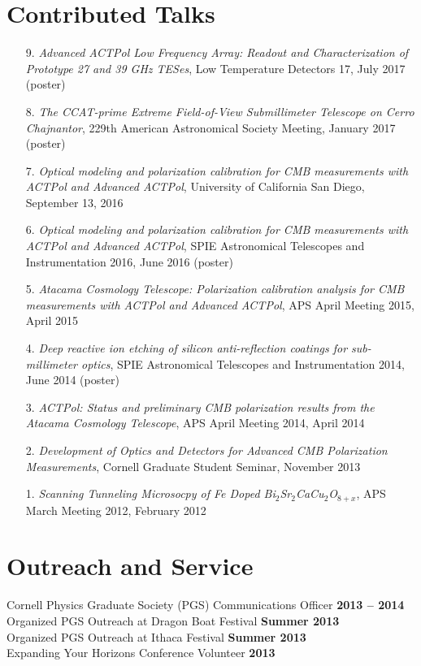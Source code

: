 \documentclass[margin,line]{res}
\begin{document}
\begin{resume}
\section{\sc Contributed Talks} 
\begin{enumerate}
    \item[{9.}] {\it Advanced ACTPol Low Frequency Array: Readout and Characterization of Prototype 27 and 39 GHz TESes},
      Low Temperature Detectors 17, July 2017 (poster)
    \item[{8.}] {\it The CCAT-prime Extreme Field-of-View Submillimeter Telescope on Cerro Chajnantor},
      229th American Astronomical Society Meeting, January 2017 (poster)
    \item[{7.}] {\it Optical modeling and polarization calibration for CMB measurements with ACTPol and Advanced ACTPol},
      University of California San Diego, September 13, 2016
    \item[{6.}] {\it Optical modeling and polarization calibration for CMB measurements with ACTPol and Advanced ACTPol},
      SPIE Astronomical Telescopes and Instrumentation 2016, June 2016 (poster)
    \item[{5.}] {\it Atacama Cosmology Telescope: Polarization calibration analysis for CMB measurements with ACTPol and Advanced ACTPol},
      APS April Meeting 2015, April 2015
    \item[{4.}] {\it Deep reactive ion etching of silicon anti-reflection coatings for sub-millimeter optics},
      SPIE Astronomical Telescopes and Instrumentation 2014, June 2014 (poster)
    \item[{3.}] {\it ACTPol: Status and preliminary CMB polarization results from the Atacama Cosmology Telescope},
      APS April Meeting 2014, April 2014
    \item[{2.}] {\it Development of Optics and Detectors for Advanced CMB Polarization Measurements},
      Cornell Graduate Student Seminar, November 2013
    \item[{1.}] {\it Scanning Tunneling Microsocpy of Fe Doped Bi$_2$Sr$_2$CaCu$_2$O$_{8+x}$},
      APS March Meeting 2012, February 2012
\end{enumerate}

\section{\sc Outreach and Service} 
Cornell Physics Graduate Society (PGS) Communications Officer \hfill \textbf{2013 -- 2014}\\
Organized PGS Outreach at Dragon Boat Festival \hfill \textbf{Summer 2013}\\
Organized PGS Outreach at Ithaca Festival \hfill \textbf{Summer 2013}\\
Expanding Your Horizons Conference Volunteer \hfill \textbf{2013}\\

\end{resume} 
\end{document}

